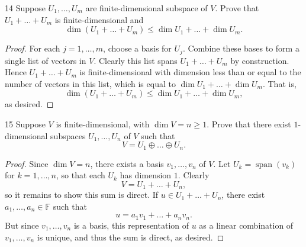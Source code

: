 \documentclass{extarticle}
\newenvironment{problem}[1]{\begin{prob*}{#1}{}}{\end{prob*}}
\newcommand{\F}{\mathbb{F}}
\DeclareMathOperator{\Span}{span}
\begin{document}
\begin{problem}{14}
Suppose $U_1,\dots,U_m$ are finite-dimensional subspace of $V$.  Prove that $U_1 + \dots + U_m$ is finite-dimensional and 
\begin{equation*}
\dim\left(U_1  + \dots + U_m\right)\leq \dim U_1 + \dots + \dim U_m.
\end{equation*}
\end{problem}
\begin{proof}
For each $j = 1,\dots,m$, choose a basis for $U_j$.  Combine these bases to form a single list of vectors in $V$.  Clearly this list spans $U_1 + \dots + U_m$ by construction.  Hence $U_1 + \dots + U_m$ is finite-dimensional with dimension less than or equal to the number of vectors in this list, which is equal to $\dim U_1 + \dots + \dim U_m$.  That is,
\begin{equation*}
\dim\left(U_1 + \dots + U_m\right)\leq \dim U_1 + \dots + \dim U_m,
\end{equation*} 
as desired.
\end{proof}

\begin{problem}{15}
Suppose $V$ is finite-dimensional, with $\dim V= n\geq 1$.  Prove that there exist $1$-dimensional subspaces $U_1,\dots, U_n$ of $V$ such that 
\begin{equation*}
V = U_1\oplus \dots \oplus U_n.
\end{equation*}
\end{problem}
\begin{proof}
Since $\dim V = n$, there exists a basis $v_1,\dots, v_n$ of $V$.  Let $U_k = \Span(v_k)$ for $k = 1,\dots, n$, so that each $U_k$ has dimension $1$.  Clearly 
\begin{equation*}
V = U_1 + \dots + U_n,
\end{equation*}
so it remains to show this sum is direct.  If $u \in U_1 + \dots + U_n$, there exist $a_1,\dots, a_n\in\F$ such that
\begin{equation*}
u = a_1v_1 + \dots + a_nv_n.
\end{equation*}
But since $v_1,\dots, v_n$ is a basis, this representation of $u$ as a linear combination of $v_1,\dots,v_n$ is unique, and thus the sum is direct, as desired.
\end{proof}
\end{document}
